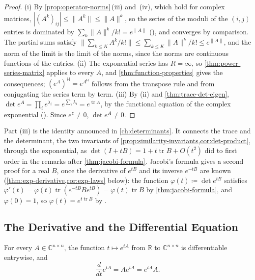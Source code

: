 \begin{proof}
(i) By \cref{prop:operator-norms}\,(iii) and~(iv), which hold for complex matrices, $|(A^k)_{ij}|\le\|A^k\|\le\|A\|^k$, so the series of the moduli of the $(i,j)$ entries is dominated by $\sum_k\|A\|^k/k!=e^{\|A\|}$ (), and converges by comparison. The partial sums satisfy $\|\sum_{k\le K}A^k/k!\|\le\sum_{k\le K}\|A\|^k/k!\le e^{\|A\|}$, and the norm of the limit is the limit of the norms, since the norms are continuous functions of the entries. (ii) The exponential series has $R=\infty$, so \cref{thm:power-series-matrix} applies to every $A$, and \cref{thm:function-properties} gives the consequences; $(e^A)^{\mathsf H}=e^{A^{\mathsf H}}$ follows from the transpose rule and from conjugating the series term by term. (iii) By (ii) and \cref{thm:trace-det-eigen}, $\det e^A=\prod_ie^{\lambda_i}=e^{\sum_i\lambda_i}=e^{\operatorname{tr}A}$, by the functional equation of the complex exponential (). Since $e^z\ne0$, $\det e^A\ne0$.
\end{proof}

Part (iii) is the identity announced in \cref{ch:determinants}. It connects the trace and the determinant, the two invariants of \cref{prop:similarity-invariants,cor:det-product}, through the exponential, as $\det(I+tB)=1+t\operatorname{tr}B+O(t^2)$ did to first order in the remarks after \cref{thm:jacobi-formula}. Jacobi's formula gives a second proof for a real $B$, once the derivative of $e^{tB}$ and its inverse $e^{-tB}$ are known (\cref{thm:exp-derivative,cor:exp-laws} below): the function $\varphi(t)\coloneqq\det e^{tB}$ satisfies $\varphi'(t)=\varphi(t)\operatorname{tr}(e^{-tB}Be^{tB})=\varphi(t)\operatorname{tr}B$ by \cref{thm:jacobi-formula}, and $\varphi(0)=1$, so $\varphi(t)=e^{t\operatorname{tr}B}$ by .

\subsection{The Derivative and the Differential Equation}

\begin{theorem}
\label{thm:exp-derivative}
For every $A\in\mathbb C^{n\times n}$, the function $t\mapsto e^{tA}$ from $\mathbb R$ to $\mathbb C^{n\times n}$ is differentiable entrywise, and
\[
\frac d{dt}e^{tA}=Ae^{tA}=e^{tA}A .
\]
\end{theorem}

